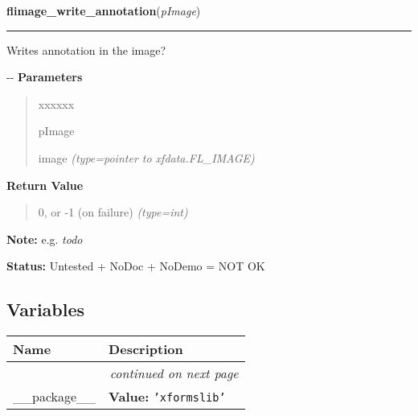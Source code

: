     \vspace{0.5ex}

\hspace{.8\funcindent}\begin{boxedminipage}{\funcwidth}

    \raggedright \textbf{flimage\_write\_annotation}(\textit{pImage})

    \vspace{-1.5ex}

    \rule{\textwidth}{0.5\fboxrule}
\setlength{\parskip}{2ex}

Writes annotation in the image?

-{}-
\setlength{\parskip}{1ex}
      \textbf{Parameters}
      \vspace{-1ex}

      \begin{quote}
        \begin{Ventry}{xxxxxx}

          \item[pImage]


image
            {\it (type=pointer to xfdata.FL\_IMAGE)}

        \end{Ventry}

      \end{quote}

      \textbf{Return Value}
    \vspace{-1ex}

      \begin{quote}

0, or -1 (on failure)
      {\it (type=int)}

      \end{quote}

\textbf{Note:} 
e.g. \emph{todo}


\textbf{Status:} 
Untested + NoDoc + NoDemo = NOT OK


    \end{boxedminipage}



  \subsection{Variables}

    \vspace{-1cm}
\hspace{\varindent}\begin{longtable}{|p{\varnamewidth}|p{\vardescrwidth}|l}
\cline{1-2}
\cline{1-2} \centering \textbf{Name} & \centering \textbf{Description}& \\
\cline{1-2}
\endhead\cline{1-2}\multicolumn{3}{r}{\small\textit{continued on next page}}\\\endfoot\cline{1-2}
\endlastfoot\raggedright \_\-\_\-p\-a\-c\-k\-a\-g\-e\-\_\-\_\- & \raggedright \textbf{Value:} 
{\tt \texttt{'}\texttt{xformslib}\texttt{'}}&\\
\cline{1-2}
\end{longtable}


